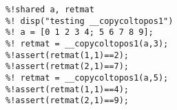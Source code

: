 \begin{verbatim}
%!shared a, retmat
%! disp("testing __copycoltopos1")
%! a = [0 1 2 3 4; 5 6 7 8 9];
%! retmat = __copycoltopos1(a,3);
%!assert(retmat(1,1)==2);
%!assert(retmat(2,1)==7);
%! retmat = __copycoltopos1(a,5);
%!assert(retmat(1,1)==4);
%!assert(retmat(2,1)==9);
\end{verbatim}

